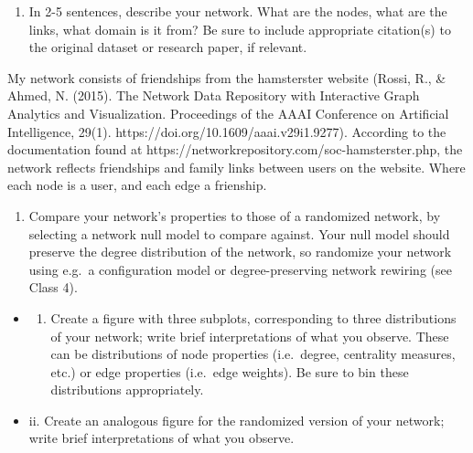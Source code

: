 \documentclass[11pt]{article}
\providecommand{\tightlist}{%
      \setlength{\itemsep}{0pt}\setlength{\parskip}{0pt}}
\begin{document}
    \begin{enumerate}
\def\labelenumi{(\alph{enumi})}
\tightlist
\item
  In 2-5 sentences, describe your network. What are the nodes, what are
  the links, what domain is it from? Be sure to include appropriate
  citation(s) to the original dataset or research paper, if relevant.
\end{enumerate}

    My network consists of friendships from the hamsterster website (Rossi,
R., \& Ahmed, N. (2015). The Network Data Repository with Interactive
Graph Analytics and Visualization. Proceedings of the AAAI Conference on
Artificial Intelligence, 29(1).
https://doi.org/10.1609/aaai.v29i1.9277). According to the documentation
found at https://networkrepository.com/soc-hamsterster.php, the network
reflects friendships and family links between users on the website.
Where each node is a user, and each edge a frienship.

    \begin{enumerate}
\def\labelenumi{(\alph{enumi})}
\setcounter{enumi}{1}
\tightlist
\item
  Compare your network's properties to those of a randomized network, by
  selecting a network null model to compare against. Your null model
  should preserve the degree distribution of the network, so randomize
  your network using e.g.~a configuration model or degree-preserving
  network rewiring (see Class 4).
\end{enumerate}

\begin{itemize}
\tightlist
\item
  \begin{enumerate}
  \def\labelenumi{\roman{enumi}.}
  \tightlist
  \item
    Create a figure with three subplots, corresponding to three
    distributions of your network; write brief interpretations of what
    you observe. These can be distributions of node properties
    (i.e.~degree, centrality measures, etc.) or edge properties
    (i.e.~edge weights). Be sure to bin these distributions
    appropriately.
  \end{enumerate}
\item
  ii. Create an analogous figure for the randomized version of your
  network; write brief interpretations of what you observe.
\end{itemize}
\end{document}
